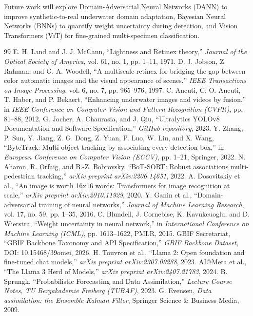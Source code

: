 \documentclass[11pt,a4paper]{article}
\newcommand{\citeblue}[1]{\cite{#1}}
\begin{document}
Future work will explore Domain-Adversarial Neural Networks (DANN) \citeblue{ganin2016domain} to improve synthetic-to-real underwater domain adaptation, Bayesian Neural Networks (BNNs) \citeblue{blundell2015weight} to quantify weight uncertainty during detection, and Vision Transformers (ViT) \citeblue{dosovitskiy2020image} for fine-grained multi-specimen classification.

\begin{thebibliography}{99}
 E. H. Land and J. J. McCann, ``Lightness and Retinex theory,'' \textit{Journal of the Optical Society of America}, vol. 61, no. 1, pp. 1--11, 1971.
 D. J. Jobson, Z. Rahman, and G. A. Woodell, ``A multiscale retinex for bridging the gap between color automatic images and the visual appearance of scenes,'' \textit{IEEE Transactions on Image Processing}, vol. 6, no. 7, pp. 965--976, 1997.
 C. Ancuti, C. O. Ancuti, T. Haber, and P. Bekaert, ``Enhancing underwater images and videos by fusion,'' in \textit{IEEE Conference on Computer Vision and Pattern Recognition (CVPR)}, pp. 81--88, 2012.
 G. Jocher, A. Chaurasia, and J. Qiu, ``Ultralytics YOLOv8 Documentation and Software Specification,'' \textit{GitHub repository}, 2023.
 Y. Zhang, P. Sun, Y. Jiang, Z. G. Dong, Z. Yuan, P. Luo, W. Liu, and X. Wang, ``ByteTrack: Multi-object tracking by associating every detection box,'' in \textit{European Conference on Computer Vision (ECCV)}, pp. 1--21, Springer, 2022.
 N. Aharon, R. Orfaig, and B.-Z. Bobrovsky, ``BoT-SORT: Robust associations multi-pedestrian tracking,'' \textit{arXiv preprint arXiv:2206.14651}, 2022.
 A. Dosovitskiy et al., ``An image is worth 16x16 words: Transformers for image recognition at scale,'' \textit{arXiv preprint arXiv:2010.11929}, 2020.
 Y. Ganin et al., ``Domain-adversarial training of neural networks,'' \textit{Journal of Machine Learning Research}, vol. 17, no. 59, pp. 1--35, 2016.
 C. Blundell, J. Cornebise, K. Kavukcuoglu, and D. Wierstra, ``Weight uncertainty in neural network,'' in \textit{International Conference on Machine Learning (ICML)}, pp. 1613--1622, PMLR, 2015.
 GBIF Secretariat, ``GBIF Backbone Taxonomy and API Specification,'' \textit{GBIF Backbone Dataset}, DOI: 10.15468/39omei, 2026.
 H. Touvron et al., ``Llama 2: Open foundation and fine-tuned chat models,'' \textit{arXiv preprint arXiv:2307.09288}, 2023.
 AI@Meta et al., ``The Llama 3 Herd of Models,'' \textit{arXiv preprint arXiv:2407.21783}, 2024.
 B. Sprungk, ``Probabilistic Forecasting and Data Assimilation,'' \textit{Lecture Course Notes, TU Bergakademie Freiberg (TUBAF)}, 2023.
 G. Evensen, \textit{Data assimilation: the Ensemble Kalman Filter}, Springer Science \& Business Media, 2009.
\end{thebibliography}
\end{document}
